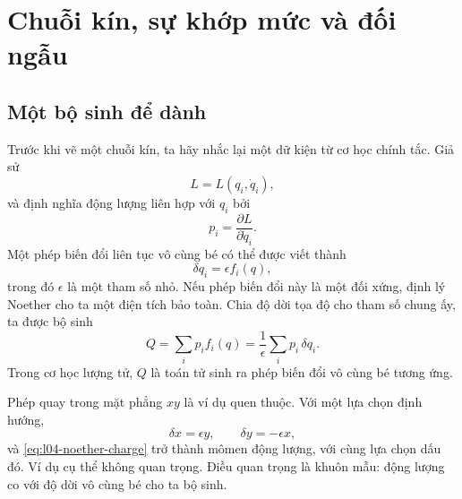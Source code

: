 \chapter{Chuỗi kín, sự khớp mức và đối ngẫu}


\section{Một bộ sinh để dành}

Trước khi vẽ một chuỗi kín, ta hãy nhắc lại một dữ kiện từ cơ học chính tắc. Giả sử
\begin{equation}
  L=L(q_i,\dot q_i),
\end{equation}
và định nghĩa động lượng liên hợp với \(q_i\) bởi
\begin{equation}
  p_i=\frac{\partial L}{\partial\dot q_i}.
\end{equation}
Một phép biến đổi liên tục vô cùng bé có thể được viết thành
\begin{equation}
  \delta q_i=\epsilon f_i(q),
  \label{eq:l04-infinitesimal-transformation}
\end{equation}
trong đó \(\epsilon\) là một tham số nhỏ. Nếu phép biến đổi này là một đối xứng, định lý Noether cho ta một điện tích bảo toàn. Chia độ dời tọa độ cho tham số chung ấy, ta được bộ sinh
\begin{equation}
  Q=\sum_i p_i f_i(q)
   =\frac{1}{\epsilon}\sum_i p_i\,\delta q_i.
  \label{eq:l04-noether-charge}
\end{equation}
Trong cơ học lượng tử, \(Q\) là toán tử sinh ra phép biến đổi vô cùng bé tương ứng.

Phép quay trong mặt phẳng \(xy\) là ví dụ quen thuộc. Với một lựa chọn định hướng,
\begin{equation}
  \delta x=\epsilon y,
  \qquad
  \delta y=-\epsilon x,
\end{equation}
và \eqref{eq:l04-noether-charge} trở thành mômen động lượng, với cùng lựa chọn dấu đó. Ví dụ cụ thể không quan trọng. Điều quan trọng là khuôn mẫu: động lượng co với độ dời vô cùng bé cho ta bộ sinh.

